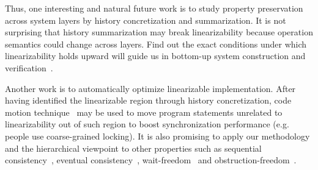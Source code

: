 \documentclass[a4paper,USenglish]{lipics-v2016}
\newcommand{\lin}{linearizability}
\newcommand{\linb}{linearizable}
\begin{document}
Thus, one interesting and natural future work is to study property preservation across system layers
by history concretization and summarization.
It is not surprising that history summarization may break {\lin} because operation semantics could change across layers.
Find out the exact conditions under which {\lin} holds upward
will guide us in bottom-up system construction and verification~\cite{export:121499, vafeiadis2009shape, Colvin06formalverification, Vafeiadis06provingcorrectness, DBLP:conf/esop/ZomerGRS14}.


Another work is to automatically optimize {\linb} implementation.
After having identified the {\linb} region through history concretization,
code motion technique~\cite{Aho:1986:CPT:6448, nnh2010} may be used to move program statements unrelated to {\lin} out of such region to boost synchronization performance (e.g. people use coarse-grained locking).
It is also promising to apply our methodology and the hierarchical viewpoint to other properties
such as sequential consistency~\cite{Lamport:1979:MMC:1311099.1311750},
eventual consistency~\cite{Vogels:2009:EC:1435417.1435432, Serafini:2010:ELS:1835698.1835723},
wait-freedom~\cite{Herlihy:1991:WS:114005.102808} and obstruction-freedom~\cite{Herlihy:2003}.



\end{document}
